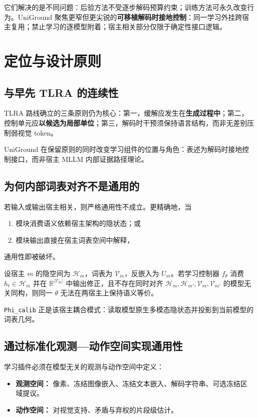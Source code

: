 它们解决的是不同问题：后验方法不受逐步解码预算约束；训练方法可永久改变行为。UniGround 聚焦更窄但更尖锐的\textbf{可移植解码时接地控制}：同一学习外挂跨宿主复用；禁止学习的逐模型附着；宿主相关部分仅限于确定性接口逻辑。

\section{定位与设计原则}
\label{sec:positioning}

\subsection{与早先 TLRA 的连续性}

TLRA 路线确立的三条原则仍为核心：第一，缓解应发生在\textbf{生成过程中}；第二，控制单元应\textbf{以候选为局部单位}；第三，解码时干预须保持语言结构，而非无差别压制弱视觉 token。

UniGround 在保留原则的同时改变学习组件的位置与角色：表述为解码时接地控制接口，而非宿主 MLLM 内部证据路径理论。

\subsection{为何内部词表对齐不是通用的}

若输入或输出宿主相关，则严格通用性不成立。更精确地，当
\begin{enumerate}
  \item 模块消费语义依赖宿主架构的隐状态；或
  \item 模块输出直接在宿主词表空间中解释，
\end{enumerate}
通用性即被破坏。

设宿主 $m$ 的隐空间为 $\mathcal{H}_m$，词表为 $\mathcal{V}_m$，反嵌入为 $U_m$。若学习控制器 $f_\theta$ 消费 $h_t \in \mathcal{H}_m$ 并在 $\mathbb{R}^{|\mathcal{V}_m|}$ 中输出修正，且不存在同时对齐 $\mathcal{H}_m,\mathcal{H}_{m'},\mathcal{V}_m,\mathcal{V}_{m'}$ 的模型无关同构，则同一 $\theta$ 无法在两宿主上保持语义等价。

\texttt{Phi\_calib} 正是该宿主耦合模式：读取模型原生多模态隐状态并投影到当前模型的词表几何。

\subsection{通过标准化观测—动作空间实现通用性}

学习插件必须在模型无关的观测与动作空间中定义：
\begin{itemize}
  \item \textbf{观测空间：} 像素、冻结图像嵌入、冻结文本嵌入、解码字符串、可选冻结区域提议。
  \item \textbf{动作空间：} 对视觉支持、矛盾与弃权的片段级估计。
\end{itemize}

